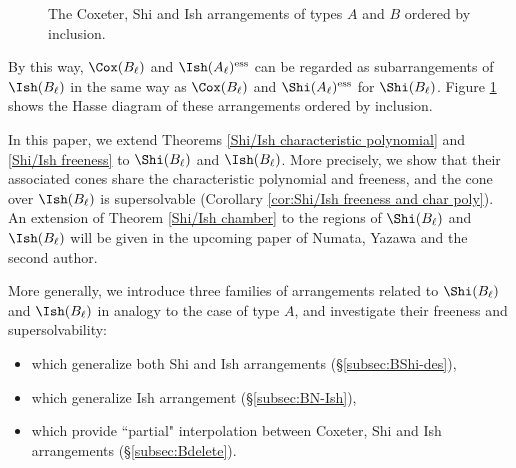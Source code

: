 \begin{figure}[htbp!]
\centering
{}
\caption{The Coxeter, Shi and Ish arrangements of types $A$ and $B$ ordered by inclusion.}
\label{fig:Hasse shi ish}
\end{figure}

By this way, $\Cox(B_{\ell})$ and $\Ish(A_{\ell})^{\mathrm{ess}}$ can be regarded as subarrangements of $\Ish(B_{\ell})$ in the same way as $\Cox(B_{\ell})$ and $\Shi(A_{\ell})^{\mathrm{ess}}$ for $\Shi(B_{\ell})$. 
Figure \ref{fig:Hasse shi ish} shows the Hasse diagram of these arrangements ordered by inclusion.  

In this paper, we extend Theorems \ref{Shi/Ish characteristic polynomial} and \ref{Shi/Ish freeness} to $\Shi(B_{\ell})$ and $\Ish(B_{\ell})$. 
More precisely, we show that their associated cones share the characteristic polynomial and freeness, and the cone over  $\Ish(B_{\ell})$ is supersolvable (Corollary \ref{cor:Shi/Ish freeness and char poly}).  
An extension of Theorem \ref{Shi/Ish chamber} to the regions of $\Shi(B_\ell)$ and $\Ish(B_\ell)$ will be given in the upcoming paper  \cite{NTY} of Numata, Yazawa and the second author. 


 

More generally, we introduce three families of arrangements related to $\Shi(B_{\ell})$ and $\Ish(B_{\ell})$ in analogy to the case of type $A$, and investigate their freeness and supersolvability:
\begin{itemize}
\item {} which generalize both Shi and Ish arrangements (\S\ref{subsec:BShi-des}), 
\item {} which generalize Ish arrangement (\S\ref{subsec:BN-Ish}), 
\item {} which provide ``partial" interpolation between Coxeter, Shi and Ish arrangements (\S\ref{subsec:Bdelete}). 
\end{itemize}

